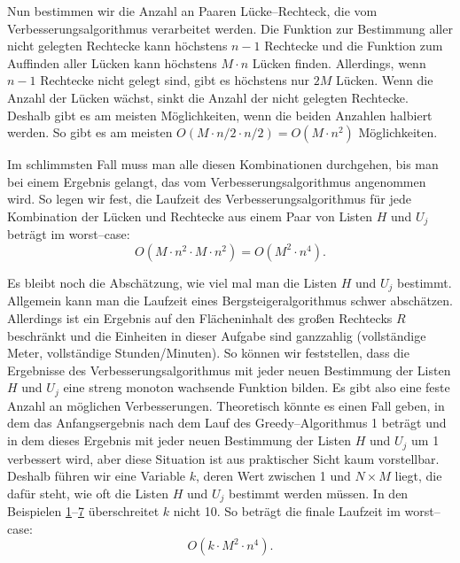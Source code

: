 Nun bestimmen wir die Anzahl an Paaren Lücke--Rechteck, die vom Verbesserungsalgorithmus
verarbeitet werden. Die Funktion zur Bestimmung aller nicht gelegten Rechtecke kann
höchstens $n-1$ Rechtecke und die Funktion zum Auffinden aller Lücken kann 
höchstens $M \cdot n$ Lücken finden.
Allerdings, wenn $n-1$ Rechtecke nicht gelegt sind, gibt es höchstens nur $2M$ Lücken.
Wenn die Anzahl der Lücken wächst, sinkt die Anzahl der nicht gelegten Rechtecke.
Deshalb gibt es am meisten Möglichkeiten, wenn die beiden Anzahlen halbiert werden.
So gibt es am meisten $O(M \cdot n/2 \cdot n/2) = O(M \cdot n^2)$ Möglichkeiten.

Im schlimmsten Fall muss man alle diesen Kombinationen durchgehen, bis man
bei einem Ergebnis gelangt, das vom Verbesserungsalgorithmus angenommen wird.
So legen wir fest, die Laufzeit des Verbesserungsalgorithmus
für jede Kombination der Lücken und Rechtecke aus einem Paar von Listen $H$ und $U_j$
beträgt im worst--case:
\[
	O(M \cdot n^2 \cdot M \cdot n^2) = O(M^2 \cdot n^4).
\]

Es bleibt noch die Abschätzung, wie viel mal man die Listen $H$ und $U_j$ bestimmt.
Allgemein kann man die Laufzeit eines Bergsteigeralgorithmus schwer abschätzen.
Allerdings ist ein Ergebnis auf den Flächeninhalt des großen Rechtecks $R$ beschränkt
und die Einheiten in dieser Aufgabe sind ganzzahlig (vollständige Meter, vollständige Stunden/Minuten).
So können wir feststellen, dass die Ergebnisse des Verbesserungsalgorithmus mit jeder
neuen Bestimmung der Listen $H$ und $U_j$ eine streng monoton wachsende Funktion bilden.
Es gibt also eine feste Anzahl an möglichen Verbesserungen.
Theoretisch könnte es einen Fall geben, in dem das Anfangsergebnis nach dem Lauf
des Greedy--Algorithmus 1 beträgt und in dem dieses Ergebnis mit jeder 
neuen Bestimmung der Listen $H$ und $U_j$ um 1 verbessert wird,
aber diese Situation ist aus praktischer Sicht kaum vorstellbar. 
Deshalb führen wir eine Variable $k$, deren Wert zwischen 1 und $N \times M$ liegt, die
dafür steht, wie oft die Listen $H$ und $U_j$ bestimmt werden müssen.
In den Beispielen \hyperref[ex:1]{1}--\hyperref[ex:7]{7} überschreitet $k$ nicht 10.
So beträgt die finale Laufzeit im worst--case:
\[
	O(k \cdot M^2 \cdot n^4).
\]
